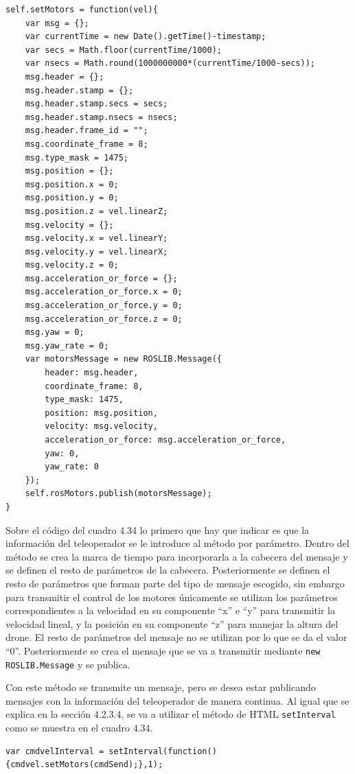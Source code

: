 \begin{lstlisting}[caption= Publicar el mensaje con la información del teleoperador, label=cod.publishetmotors]
self.setMotors = function(vel){
	var msg = {};
	var currentTime = new Date().getTime()-timestamp;
	var secs = Math.floor(currentTime/1000);
	var nsecs = Math.round(1000000000*(currentTime/1000-secs));
	msg.header = {};
	msg.header.stamp = {};
	msg.header.stamp.secs = secs;
	msg.header.stamp.nsecs = nsecs;
	msg.header.frame_id = "";
	msg.coordinate_frame = 8;
	msg.type_mask = 1475;
	msg.position = {};
	msg.position.x = 0;
	msg.position.y = 0;
	msg.position.z = vel.linearZ;
	msg.velocity = {};
	msg.velocity.x = vel.linearY;
	msg.velocity.y = vel.linearX;
	msg.velocity.z = 0;
	msg.acceleration_or_force = {};
	msg.acceleration_or_force.x = 0;
	msg.acceleration_or_force.y = 0;
	msg.acceleration_or_force.z = 0;
	msg.yaw = 0;
	msg.yaw_rate = 0;
	var motorsMessage = new ROSLIB.Message({
		header: msg.header,
		coordinate_frame: 8,
		type_mask: 1475,
		position: msg.position,
		velocity: msg.velocity,
		acceleration_or_force: msg.acceleration_or_force,
		yaw: 0,
		yaw_rate: 0
	});
	self.rosMotors.publish(motorsMessage);
}
\end{lstlisting}

Sobre el código del cuadro 4.34 lo primero que hay que indicar es que la información del teleoperador se le introduce al método por parámetro. Dentro del método se crea la marca de tiempo para incorporarla a la cabecera del mensaje y se definen el resto de parámetros de la cabecera. Posteriormente se definen el resto de parámetros que forman parte del tipo de mensaje escogido, sin embargo para transmitir el control de los motores únicamente se utilizan los parámetros correspondientes a la velocidad en su componente ``x'' e ``y'' para transmitir la velocidad lineal, y la posición en su componente ``z'' para manejar la altura del drone. El resto de parámetros del mensaje no se utilizan por lo que se da el valor ``0''. Posteriormente se crea el mensaje que se va a transmitir mediante \texttt{new ROSLIB.Message} y se publica.

Con este método se transmite un mensaje, pero se desea estar publicando mensajes con la información del teleoperador de manera continua. Al igual que se explica en la sección 4.2.3.4, se va a utilizar el método de HTML \texttt{setInterval} como se muestra en el cuadro 4.34.

\begin{lstlisting}[caption= Publicación continua del mensaje con la información del teleoperador, label=cod.intervalMotors]
var cmdvelInterval = setInterval(function(){cmdvel.setMotors(cmdSend);},1);
\end{lstlisting}

